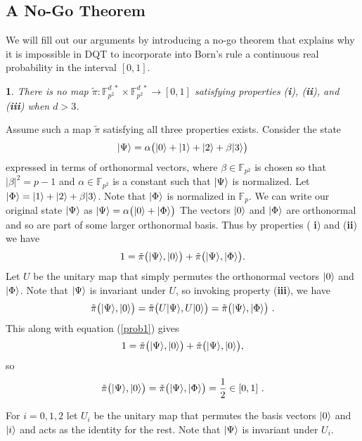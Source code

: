\documentclass[english,12pt]{iopart}
\makeatletter
\theoremstyle{plain}
\newtheorem{thm}{\protect\theoremname}
\newenvironment{proof}[1][\protect\proofname]{\par
\normalfont\topsep6\p@\@plus6\p@\relax
\trivlist
\itemindent\parindent
\item[\hskip\labelsep\scshape #1]\ignorespaces
}{%
\endtrivlist\@endpefalse
}
\providecommand{\proofname}{Proof}
\theoremstyle{definition}
\newcommand{\ff}[1]{\mathbb{F}_{#1}}
\newcommand{\ffzd}[1]{{\mathbb{F}^{d\;*}_{#1}}}
\newcommand{\dpt}{{\tilde{\pi}}}
\providecommand{\theoremname}{Theorem}
\makeatother
\begin{document}
\subsection{\label{sub:A-No-Go-Theorem}A No-Go Theorem}

We will fill out our arguments by introducing a no-go theorem that
explains why it is impossible in DQT to incorporate into Born's rule a
continuous real probability in the interval $[0,1]$.

\begin{thm}
\label{theorem1} There is no map $\dpt\colon\ffzd{p^{2}}\times\ffzd{p^{2}}\longrightarrow[0,1]$
satisfying properties ({\bf i}), ({\bf ii}), and ({\bf iii})
when $d>3$. \end{thm}
%
\begin{proof}
Assume such a map $\dpt$ satisfying all three properties exists.
Consider the state 
\[
{\left\vert{\Psi}\right\rangle}=\alpha\big({\left\vert{0}\right\rangle}+{\left\vert{1}\right\rangle}+{\left\vert{2}\right\rangle}+\beta{\left\vert{3}\right\rangle}\big)
\]
expressed in terms of orthonormal vectors, where $\beta\in\ff{p^{2}}$
is chosen so that $\left|\beta\right|^{2}=p-1$ and $\alpha\in\ff{p^{2}}$
is a constant such that ${\left\vert{\Psi}\right\rangle}$ is normalized. Let ${\left\vert{\Phi}\right\rangle}={\left\vert{1}\right\rangle}+{\left\vert{2}\right\rangle}+\beta{\left\vert{3}\right\rangle}$.
Note that ${\left\vert{\Phi}\right\rangle}$ is normalized in $\ff{p}$. We can write our
original state ${\left\vert{\Psi}\right\rangle}$ as ${\left\vert{\Psi}\right\rangle}=\alpha\big({\left\vert{0}\right\rangle}+{\left\vert{\Phi}\right\rangle}\big)$
The vectors ${\left\vert{0}\right\rangle}$ and ${\left\vert{\Phi}\right\rangle}$ are orthonormal and so are
part of some larger orthonormal basis. Thus by properties ({\bf
i}) and ({\bf ii}) we have 
\begin{equation}
1=\dpt\big(\ket{\Psi},\ket{0}\big)+\dpt\big(\ket{\Psi},\ket{\Phi}\big).\label{prob1}
\end{equation}
Let $U$ be the unitary map that simply permutes the orthonormal vectors
${\left\vert{0}\right\rangle}$ and ${\left\vert{\Phi}\right\rangle}$. Note that ${\left\vert{\Psi}\right\rangle}$ is invariant
under $U$, so invoking property ({\bf iii}), we have 
\[
\dpt\big(\ket{\Psi},\ket{0}\big)=\dpt\big(U\ket{\Psi},U\ket{0}\big)=\dpt\big(\ket{\Psi},\ket{\Phi}\big)\ .
\]
This along with equation (\ref{prob1}) gives 
\[
1=\dpt\big(\ket{\Psi},\ket{0}\big)+\dpt\big(\ket{\Psi},\ket{0}\big),
\]
so 
\begin{equation}
\dpt\big(\ket{\Psi},\ket{0}\big)=\dpt\big(\ket{\Psi},\ket{\Phi}\big)=\frac{1}{2}\in[0,1]\ .\label{prob2}
\end{equation}
\par For $i=0,1,2$ let $U_{i}$ be the unitary map that permutes
the basis vectors ${\left\vert{0}\right\rangle}$ and ${\left\vert{i}\right\rangle}$ and acts as the identity
for the rest. Note that ${\left\vert{\Psi}\right\rangle}$ is invariant under $U_{i}$.

\end{proof}
\end{document}
